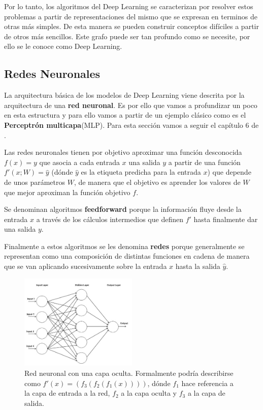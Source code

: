     Por lo tanto, los algoritmos del Deep Learning se caracterizan por resolver estos problemas a partir de representaciones del mismo que se expresan en terminos de otras más simples. De esta manera se pueden construir conceptos difíciles a partir de otros más sencillos. Este grafo puede ser tan profundo como se necesite, por ello se le conoce como Deep Learning.

    \subsection{Redes Neuronales}
        La arquitectura básica de los modelos de Deep Learning viene descrita por la arquitectura de una \textbf{red neuronal}. Es por ello que vamos a profundizar un poco en esta estructura y para ello vamos a partir de un ejemplo clásico como es el \textbf{Perceptrón multicapa}(MLP). Para esta sección vamos a seguir el capítulo 6 de \cite{Goodfellow-et-al-2016}.

        \medskip

        \noindent Las redes neuronales tienen por objetivo aproximar una función desconocida $f(x)=y$ que asocia a cada entrada $x$ una salida $y$ a partir de una función $f'(x;W)= \widehat{y}$ (dónde $\widehat{y}$ es la etiqueta predicha para la entrada $x$) que depende de unos parámetros $W$, de manera que el objetivo es aprender los valores de $W$ que mejor aproximan la función objetivo $f$.

        \medskip

        \noindent Se denominan algoritmos \textbf{feedforward} porque la información fluye desde la entrada $x$ a través de los cálculos intermedios que definen $f'$ hasta finalmente dar una salida $y$.

        \medskip

        \noindent Finalmente a estos algoritmos se les denomina \textbf{redes} porque generalmente se representan como una composición de distintas funciones en cadena de manera que se van aplicando sucesivamente sobre la entrada $x$ hasta la salida $\widehat{y}$. 

        \begin{figure}[!h]
            \centering
            \includegraphics[width=0.5\textwidth]{img/single_hidden_layer.jpg}
            \caption{Red neuronal con una capa oculta. Formalmente podría describirse como $f'(x)=(f_3(f_2(f_1(x))))$, dónde $f_1$ hace referencia a la capa de entrada a la red, $f_2$ a la capa oculta y $f_3$ a la capa de salida.}
            \label{fig:red_neuronal_capa_oculta}
          \end{figure}

